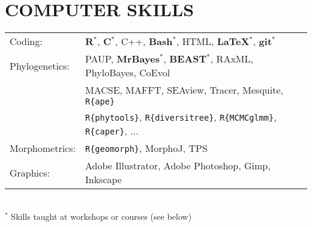 \documentclass[10pt,a4paper]{article}
\begin{document}
{\section{COMPUTER SKILLS}
\begin{tabular}{ll}
Coding: & \textbf{{R}$^{*}$}, \textbf{C$^{*}$}, C++, \textbf{Bash$^{*}$}, HTML, \textbf{\LaTeX$^{*}$}, \textbf{git$^{*}$}\\[1.5ex]
Phylogenetics: & PAUP, \textbf{MrBayes$^{*}$}, \textbf{BEAST$^{*}$}, RAxML, PhyloBayes, CoEvol \\
& MACSE, MAFFT, SEAview, Tracer, Mesquite, \texttt{R\{ape\}} \\
& \texttt{R\{phytools\}}, \texttt{R\{diversitree\}}, \texttt{R\{MCMCglmm\}}, \texttt{R\{caper\}}, ... \\[1.5ex]
Morphometrics: & \texttt{R\{geomorph\}}, MorphoJ, TPS \\[1.5ex]
Graphics: & Adobe Illustrator, Adobe Photoshop, Gimp, Inkscape\\[1.5ex]
\end{tabular} \\
$^{*}$ Skills taught at workshops or courses (see below)
\bigskip

}
\end{document}
